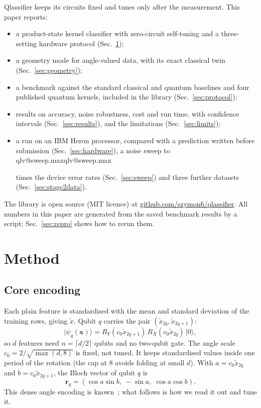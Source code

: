 \documentclass[aps,pra,reprint,superscriptaddress,nofootinbib,longbibliography]{revtex4-2}
\makeatletter
\newcommand{\val}[1]{\ifcsname qlv@#1\endcsname\csname qlv@#1\endcsname\else
  \PackageError{qlassifier}{No value '#1'}{Run python scripts/paper_tables.py}\fi}
\newcommand{\ket}[1]{\lvert #1 \rangle}
\newcommand{\repo}{\href{https://github.com/szymon6/qlassifier}{github.com/szymon6/qlassifier}}
\makeatother
\begin{document}
Qlassifier keeps its circuits fixed and tunes only after the measurement. This paper reports:
\begin{itemize}
\item a product-state kernel classifier with zero-circuit self-tuning and a three-setting hardware protocol
  (Sec.~\ref{sec:method});
\item a geometry mode for angle-valued data, with its exact classical twin (Sec.~\ref{sec:geometry});
\item a benchmark against the standard classical and quantum baselines and four published quantum kernels, included in
  the library (Sec.~\ref{sec:protocol});
\item results on accuracy, noise robustness, cost and run time, with confidence intervals (Sec.~\ref{sec:results}),
  and the limitations (Sec.~\ref{sec:limits});
\item a run on an IBM Heron processor, compared with a prediction written before submission
  (Sec.~\ref{sec:hardware}), a noise sweep to \val{sweep.max} times the device error rates (Sec.~\ref{sec:sweep}) and
  three further datasets (Sec.~\ref{sec:stage2data}).
\end{itemize}
The library is open source (MIT licence) at \repo. All numbers in this paper are generated from the saved benchmark
results by a script; Sec.~\ref{sec:repro} shows how to rerun them.

\section{Method}
\label{sec:method}

\subsection{Core encoding}
Each plain feature is standardised with the mean and standard deviation of the training rows, giving $\tilde{x}$.
Qubit $q$ carries the pair $(\tilde x_{2q}, \tilde x_{2q+1})$:
\begin{equation}
\ket{\psi_q(\mathbf{x})} = R_Y(c_0 \tilde x_{2q+1})\, R_X(c_0 \tilde x_{2q})\, \ket{0},
\label{eq:encoding}
\end{equation}
so $d$ features need $n = \lceil d/2 \rceil$ qubits and no two-qubit gate. The angle scale $c_0 = 2/\sqrt{\max(d, 8)}$
is fixed, not tuned. It keeps standardised values inside one period of the rotation (the cap at 8 avoids folding at
small $d$). With $a = c_0 \tilde x_{2q}$ and $b = c_0 \tilde x_{2q+1}$, the Bloch vector of qubit $q$ is
\begin{equation}
\mathbf{r}_q = (\cos a \sin b,\; -\sin a,\; \cos a \cos b).
\end{equation}
This dense angle encoding is known~\cite{larose2020robust,stoudenmire2016supervised}; what follows is how we read it
out and tune it.
\end{document}
